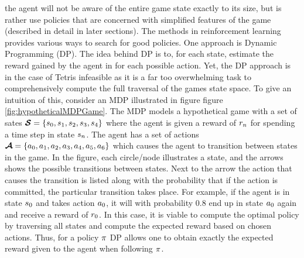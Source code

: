 the agent will not be aware of the entire game state exactly to its 
size, but is rather use policies that are concerned with simplified
features of the game (described in detail in later sections). 
The methods in reinforcement learning provides various ways to
search for good policies.
One approach is 
Dynamic Programming (DP). The idea behind DP is to, for each state,
estimate the reward gained by the agent in for each possible action.
Yet, the DP approach is in the case of Tetris infeasible as it 
is a far too overwhelming task to comprehensively compute
the full traversal of the games state space. 
To give an intuition of this, consider
an MDP illustrated in figure figure \ref{fig:hypotheticalMDPGame}.
The MDP models a hypothetical game with a set of sates 
$\boldsymbol{\mathcal{S}} = \{s_0, s_1, s_2, s_3,
s_4\}$ where the agent is given a reward of $r_n$
for spending a time step in state $s_n$. The agent has a 
set of actions $\boldsymbol{\mathcal{A}} = \{a_0, a_1, 
a_2, a_3, a_4, 
a_5, a_6\}$ which causes the agent to transition 
between states in the game. In the figure, each circle/node illustrates a 
state, and the arrows shows the possible transitions between states.
Next to the arrow the action that causes the transition is listed 
along with the probability that if the action is committed, the particular 
transition takes place. For example, if the agent is in state $s_0$
and takes action $a_0$, it will with probability 0.8 end
up in state $a_0$ again and receive a reward of $r_0$.
In this case, it is viable to compute the optimal policy by traversing
all states and compute the expected reward based on chosen actions.
Thus, for a policy $\pi$ DP allows one to obtain exactly the expected 
reward given to the agent when following $\pi$.
